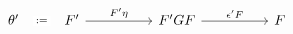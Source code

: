 \[\begin{tikzcd}
	{\theta'} & {F'} && {F'GF} && F
	\arrow["{F'\eta}", from=1-2, to=1-4]
	\arrow["{\epsilon' F}", from=1-4, to=1-6]
	\arrow["{:=}"{description}, draw=none, from=1-1, to=1-2]
\end{tikzcd}\]